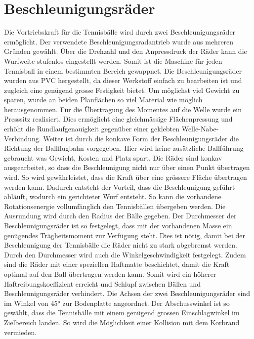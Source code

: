 \section{Beschleunigungsräder}
    Die Vortriebskraft für die Tennisbälle wird durch zwei Beschleunigungsräder ermöglicht. Der verwendete
    Beschleunigungsradantrieb wurde aus mehreren Gründen gewählt. Über die Drehzahl und den 
    Anpressdruck der Räder kann die Wurfweite stufenlos eingestellt werden. Somit ist die Maschine 
    für jeden Tennisball in einem bestimmten Bereich gewappnet. Die Beschleunigungsräder wurden 
    aus PVC hergestellt, da dieser Werkstoff einfach zu bearbeiten ist und zugleich eine genügend 
    grosse Festigkeit bietet. Um möglichst viel Gewicht zu sparen, wurde an beiden Planflächen so 
    viel Material wie möglich herausgenommen. Für die Übertragung des Momentes auf die Welle wurde 
    ein Presssitz realisiert. Dies ermöglicht eine gleichmässige Flächenpressung und erhöht die 
    Rundlaufgenauigkeit gegenüber einer geklebten Welle-Nabe-Verbindung. Weiter ist durch die konkave Form der 
    Beschleunigungsräder die Richtung der Ballflugbahn vorgegeben. Hier wird keine zusätzliche Ballführung 
    gebraucht was Gewicht, Kosten und Platz spart. Die Räder sind konkav ausgearbeitet, so dass die 
    Beschleunigung nicht nur über einen Punkt übertragen wird. So wird gewährleistet, dass die Kraft 
    über eine grössere Fläche übertragen werden kann. Dadurch entsteht der Vorteil, dass die 
    Beschleunigung geführt abläuft, wodurch ein gerichteter Wurf entsteht. So kann die vorhandene 
    Rotationsenergie vollumfänglich den Tennisbällen übergeben werden. Die Ausrundung wird durch 
    den Radius der Bälle gegeben. Der Durchmesser der Beschleunigungsräder ist so festgelegt, dass 
    mit der vorhandenen Masse ein genügendes Trägheitsmoment zur Verfügung steht. Dies ist nötig, 
    damit bei der Beschleunigung der Tennisbälle die Räder nicht zu stark abgebremst werden. Durch 
    den Durchmesser wird auch die Winkelgeschwindigkeit festgelegt. Zudem sind die Räder mit einer 
    speziellen Haftmatte beschichtet, damit die 
    Kraft optimal auf den Ball übertragen werden kann. Somit wird ein höherer Haftreibungskoeffizient 
    erreicht und Schlupf zwischen Bällen und Beschleunigungsräder verhindert. Die Achsen der zwei Beschleunigungsräder sind im 
    Winkel von 45\si{\degree} zur Bodenplatte angeordnet. Der Abschusswinkel ist so gewählt, dass 
    die Tennisbälle mit einem genügend grossen Einschlagwinkel im Zielbereich landen. So wird die 
    Möglichkeit einer Kollision mit dem Korbrand vermieden.

